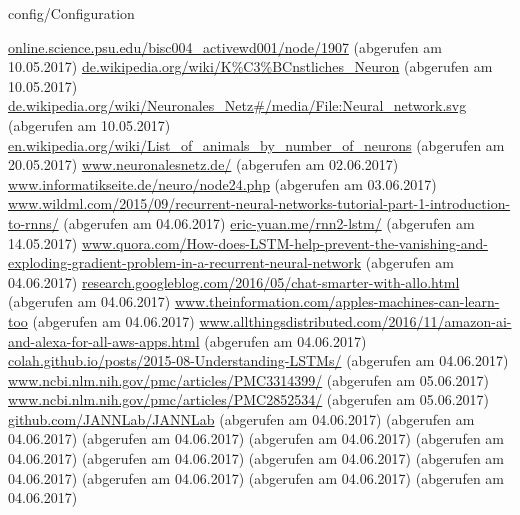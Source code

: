 \documentclass[12pt,headsepline,oneside,ngerman]{scrreprt}
\begin{document}
\graphicspath{{figures/}}

 {config/Configuration}
\pagestyle{headings}




%


%
%
%
%
%


%

\cleardoublepage

\begin{thebibliography}{xxxx}
\url{online.science.psu.edu/bisc004_activewd001/node/1907} (abgerufen am 10.05.2017)
\url{de.wikipedia.org/wiki/K%C3%BCnstliches_Neuron} (abgerufen am 10.05.2017)
\url{de.wikipedia.org/wiki/Neuronales_Netz#/media/File:Neural_network.svg} (abgerufen am 10.05.2017)
\url{en.wikipedia.org/wiki/List_of_animals_by_number_of_neurons} (abgerufen am 20.05.2017)
\url{www.neuronalesnetz.de/} (abgerufen am 02.06.2017)
\url{www.informatikseite.de/neuro/node24.php} (abgerufen am 03.06.2017)
\url{www.wildml.com/2015/09/recurrent-neural-networks-tutorial-part-1-introduction-to-rnns/} (abgerufen am 04.06.2017)
\url{eric-yuan.me/rnn2-lstm/} (abgerufen am 14.05.2017)
\url{www.quora.com/How-does-LSTM-help-prevent-the-vanishing-and-exploding-gradient-problem-in-a-recurrent-neural-network} (abgerufen am 04.06.2017)
\url{research.googleblog.com/2016/05/chat-smarter-with-allo.html} (abgerufen am 04.06.2017)
\url{www.theinformation.com/apples-machines-can-learn-too} (abgerufen am 04.06.2017)
\url{www.allthingsdistributed.com/2016/11/amazon-ai-and-alexa-for-all-aws-apps.html} (abgerufen am 04.06.2017)
\url{colah.github.io/posts/2015-08-Understanding-LSTMs/} (abgerufen am 04.06.2017)
\url{www.ncbi.nlm.nih.gov/pmc/articles/PMC3314399/} (abgerufen am 05.06.2017)
\url{www.ncbi.nlm.nih.gov/pmc/articles/PMC2852534/} (abgerufen am 05.06.2017)
\url{github.com/JANNLab/JANNLab} (abgerufen am 04.06.2017)
\url{} (abgerufen am 04.06.2017)
\url{} (abgerufen am 04.06.2017)
\url{} (abgerufen am 04.06.2017)
\url{} (abgerufen am 04.06.2017)
\url{} (abgerufen am 04.06.2017)
\url{} (abgerufen am 04.06.2017)
\url{} (abgerufen am 04.06.2017)
\url{} (abgerufen am 04.06.2017)
\url{} (abgerufen am 04.06.2017)
\url{} (abgerufen am 04.06.2017)



\end{thebibliography}
\renewcommand{\bibname}{Literaturverzeichnis}

%
\end{document}
